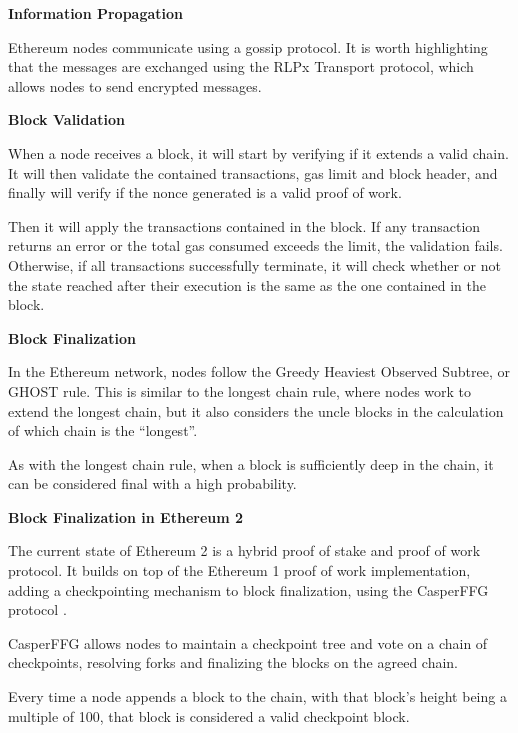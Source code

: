 \vspace{0.25cm}


\textbf{Information Propagation}

Ethereum nodes communicate using a gossip protocol. It is worth highlighting that the messages are exchanged using the RLPx Transport protocol, which allows nodes to send encrypted messages.

\vspace{0.25cm}

\textbf{Block Validation}

When a node receives a block, it will start by verifying if it extends a valid chain. It will then validate the contained transactions, gas limit and block header, and finally will verify if the nonce generated is a valid proof of work.

Then it will apply the transactions contained in the block. If any transaction returns an error or the total gas consumed exceeds the limit, the validation fails. Otherwise, if all transactions successfully terminate, it will check whether or not the state reached after their execution is the same as the one contained in the block.


\vspace{0.25cm}

\textbf{Block Finalization}

In the Ethereum network, nodes follow the Greedy Heaviest Observed Subtree, or GHOST rule. This is similar to the longest chain rule, where nodes work to extend the longest chain, but it also considers the uncle blocks in the calculation of which chain is the “longest”.

As with the longest chain rule, when a block is sufficiently deep in the chain, it can be considered final with a high probability.

\vspace{0.25cm}

\textbf{Block Finalization in Ethereum 2}

The current state of Ethereum 2 is a hybrid proof of stake and proof of work protocol. It builds on top of the Ethereum 1 proof of work implementation, adding a checkpointing mechanism to block finalization, using the CasperFFG protocol \cite{casperffg}.

CasperFFG \cite{casperffg} allows nodes to maintain a checkpoint tree and vote on a chain of checkpoints, resolving forks and finalizing the blocks on the agreed chain.

Every time a node appends a block to the chain, with that block’s height being a multiple of 100, that block is considered a valid checkpoint block.

